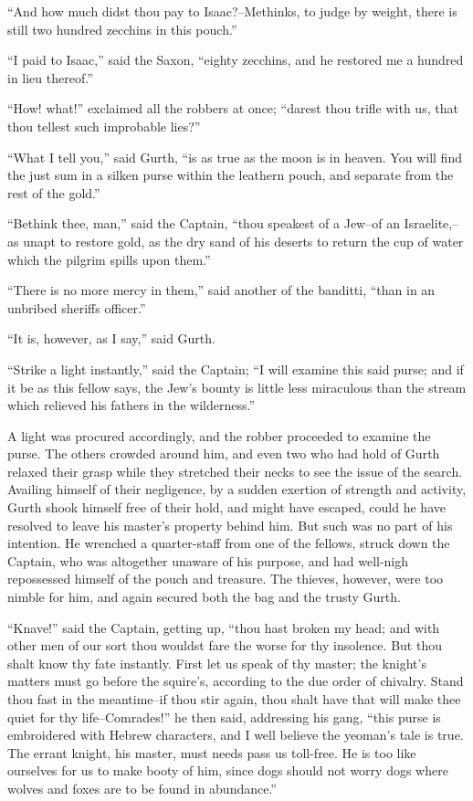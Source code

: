 ``And how much didst thou pay to Isaac?--Methinks, to judge by weight,
there is still two hundred zecchins in this pouch.''

``I paid to Isaac,'' said the Saxon, ``eighty zecchins, and he restored
me a hundred in lieu thereof.''

``How! what!'' exclaimed all the robbers at once; ``darest thou trifle
with us, that thou tellest such improbable lies?''

``What I tell you,'' said Gurth, ``is as true as the moon is in heaven.
You will find the just sum in a silken purse within the leathern pouch,
and separate from the rest of the gold.''

``Bethink thee, man,'' said the Captain, ``thou speakest of a Jew--of an
Israelite,--as unapt to restore gold, as the dry sand of his deserts to
return the cup of water which the pilgrim spills upon them.''

``There is no more mercy in them,'' said another of the banditti, ``than
in an unbribed sheriffs officer.''

``It is, however, as I say,'' said Gurth.

``Strike a light instantly,'' said the Captain; ``I will examine this
said purse; and if it be as this fellow says, the Jew's bounty is little
less miraculous than the stream which relieved his fathers in the
wilderness.''

A light was procured accordingly, and the robber proceeded to examine
the purse. The others crowded around him, and even two who had hold of
Gurth relaxed their grasp while they stretched their necks to see the
issue of the search. Availing himself of their negligence, by a sudden
exertion of strength and activity, Gurth shook himself free of their
hold, and might have escaped, could he have resolved to leave his
master's property behind him. But such was no part of his intention. He
wrenched a quarter-staff from one of the fellows, struck down the
Captain, who was altogether unaware of his purpose, and had well-nigh
repossessed himself of the pouch and treasure. The thieves, however,
were too nimble for him, and again secured both the bag and the trusty
Gurth.

``Knave!'' said the Captain, getting up, ``thou hast broken my head; and
with other men of our sort thou wouldst fare the worse for thy
insolence. But thou shalt know thy fate instantly. First let us speak of
thy master; the knight's matters must go before the squire's, according
to the due order of chivalry. Stand thou fast in the meantime--if thou
stir again, thou shalt have that will make thee quiet for thy
life--Comrades!'' he then said, addressing his gang, ``this purse is
embroidered with Hebrew characters, and I well believe the yeoman's tale
is true. The errant knight, his master, must needs pass us toll-free. He
is too like ourselves for us to make booty of him, since dogs should not
worry dogs where wolves and foxes are to be found in abundance.''

